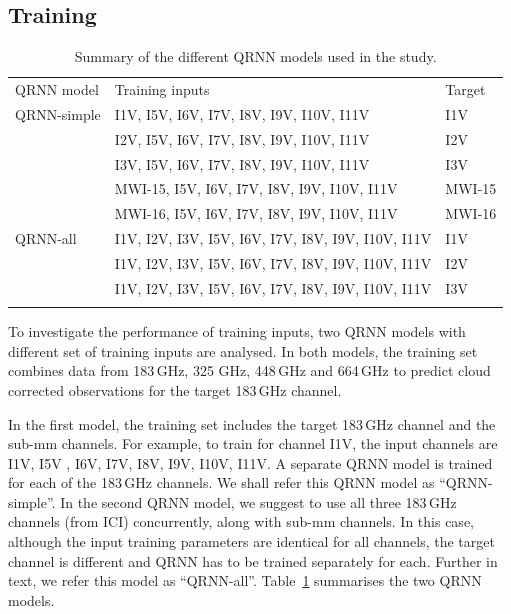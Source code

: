 \documentclass[amt, manuscript]{copernicus}
\begin{document}
\subsection{Training}
\label{sec:ici_trainin}
\begin{table}[t]
\caption{Summary of the different QRNN models used in the study.}
\label{tab:QRNN_models}
\begin{tabular}{lll}
\tophline
QRNN model & Training inputs & Target \\
\middlehline
QRNN-simple & I1V, I5V, I6V, I7V, I8V, I9V, I10V, I11V 			 & I1V\\
			& I2V, I5V, I6V, I7V, I8V, I9V, I10V, I11V 			 & I2V\\
			& I3V, I5V, I6V, I7V, I8V, I9V, I10V, I11V 			 & I3V\\
			& MWI-15, I5V, I6V, I7V, I8V, I9V, I10V, I11V 		 & MWI-15\\	
			& MWI-16, I5V, I6V, I7V, I8V, I9V, I10V, I11V 		 & MWI-16\\
QRNN-all    & I1V, I2V, I3V, I5V, I6V, I7V, I8V, I9V, I10V, I11V & I1V\\	
			& I1V, I2V, I3V, I5V, I6V, I7V, I8V, I9V, I10V, I11V & I2V\\	
			& I1V, I2V, I3V, I5V, I6V, I7V, I8V, I9V, I10V, I11V & I3V\\
			
\bottomhline
\end{tabular}
\belowtable{} %
\end{table}
To investigate the performance of training inputs, two QRNN models with different set of training inputs are analysed. In both models, the training set combines data from 183\,GHz, 325 GHz, 448\,GHz and 664\,GHz to predict cloud corrected observations for the target 183\,GHz channel.

In the first model, the training set includes the target 183\,GHz channel and the sub-mm channels. For example, to train for channel I1V, the input channels are I1V, I5V , I6V, I7V, I8V, I9V, I10V, I11V. A separate QRNN model is trained for each of the 183\,GHz channels. We shall refer this QRNN model as ``QRNN-simple''. In the second QRNN model, we suggest to use all three 183\,GHz channels (from ICI) concurrently, along with sub-mm channels. In this case, although the input training parameters are identical for all channels, the target channel is different and QRNN has to be trained separately for each. Further in text, we refer this model as ``QRNN-all''. Table~\ref{tab:QRNN_models} summarises the two QRNN models. 
   
\end{document}

